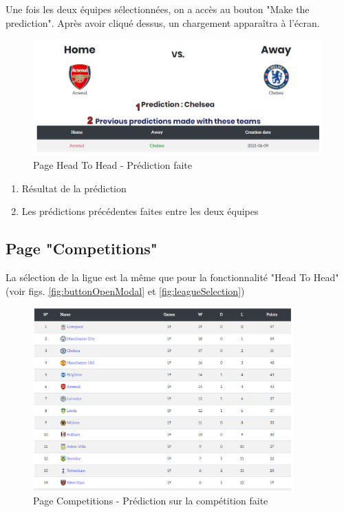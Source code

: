 \documentclass[a4paper,14pt]{extarticle}
\begin{document}
{Une fois les deux équipes sélectionnées, on a accès au bouton "Make the prediction". Après avoir cliqué dessus, un chargement apparaîtra à l'écran.

\begin{figure}[H]
    \centering
    \includegraphics[width=30em]{./img/predictionMade.png}
    \caption{Page Head To Head - Prédiction faite}
    \label{fig:predictionMade}
\end{figure}

\begin{enumerate}
    \item Résultat de la prédiction
    \item Les prédictions précédentes faites entre les deux équipes
\end{enumerate}

\subsection{Page "Competitions"}

La sélection de la ligue est la même que pour la fonctionnalité "Head To Head" (voir figs. \ref{fig:buttonOpenModal} et \ref{fig:leagueSelection})

\begin{figure}[H]
    \centering
    \includegraphics[width=27em]{./img/competitionStanding.png}
    \caption{Page Competitions - Prédiction sur la compétition faite}
    \label{fig:competitionPredictionMade}
\end{figure}

}
\end{document}

